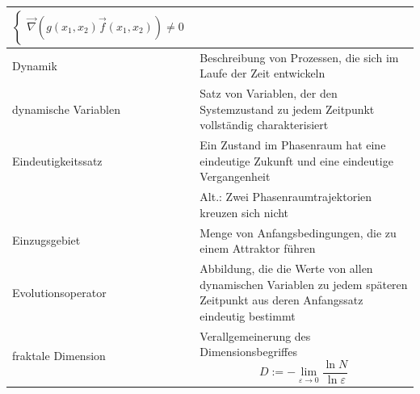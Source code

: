 \documentclass{article}
\newcommand{\lr}[1]{\left(#1\right)}
\begin{document}
\begin{xltabular}{\linewidth}{p{6cm}|X}
{\begin{equation}
\begin{cases}
						\vec{\nabla} \lr{ g(x_1, x_2) \vec{f}(x_1, x_2) } \neq 0
					\end{cases}
				\end{equation}
				} \\
	\hline
		Dynamik & Beschreibung von Prozessen, die sich im Laufe der Zeit entwickeln \\
	\hline
		dynamische Variablen & Satz von Variablen, der den Systemzustand zu jedem Zeitpunkt vollständig charakterisiert \\
	\hline
		\textcolor{gruen}{Eindeutigkeitssatz} & Ein Zustand im Phasenraum hat eine eindeutige Zukunft und eine eindeutige Vergangenheit \\
		& Alt.: Zwei Phasenraumtrajektorien kreuzen sich nicht \\
	\hline
		Einzugsgebiet & Menge von Anfangsbedingungen, die zu einem Attraktor führen \\
	\hline
		Evolutionsoperator & Abbildung, die
die Werte von allen dynamischen Variablen zu jedem späteren Zeitpunkt aus deren Anfangssatz eindeutig bestimmt \\
	\hline
		fraktale Dimension & Verallgemeinerung des Dimensionsbegriffes
			$$D := - \lim_{\varepsilon \to 0} \frac{\ln N}{\ln \varepsilon}$$
		

\end{xltabular}
\end{document}
